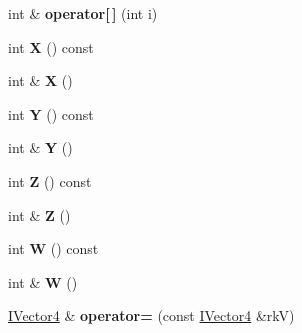 \begin{DoxyCompactItemize}
\item 
int \& {\bfseries operator\mbox{[}$\,$\mbox{]}} (int i)\hypertarget{class_i_dream_sky_1_1_i_vector4_ad8b14cfd1d022363abfdf7665750d552}{}\label{class_i_dream_sky_1_1_i_vector4_ad8b14cfd1d022363abfdf7665750d552}

\item 
int {\bfseries X} () const \hypertarget{class_i_dream_sky_1_1_i_vector4_a1c9c96bfa7fa142113f6362382d45ce4}{}\label{class_i_dream_sky_1_1_i_vector4_a1c9c96bfa7fa142113f6362382d45ce4}

\item 
int \& {\bfseries X} ()\hypertarget{class_i_dream_sky_1_1_i_vector4_ac0a1cd736bc371971488bec5e8f139ba}{}\label{class_i_dream_sky_1_1_i_vector4_ac0a1cd736bc371971488bec5e8f139ba}

\item 
int {\bfseries Y} () const \hypertarget{class_i_dream_sky_1_1_i_vector4_a7e9ff8894b63b11dab92ff2b222435a5}{}\label{class_i_dream_sky_1_1_i_vector4_a7e9ff8894b63b11dab92ff2b222435a5}

\item 
int \& {\bfseries Y} ()\hypertarget{class_i_dream_sky_1_1_i_vector4_a3a4d6d9006e744ab341617e880fbd517}{}\label{class_i_dream_sky_1_1_i_vector4_a3a4d6d9006e744ab341617e880fbd517}

\item 
int {\bfseries Z} () const \hypertarget{class_i_dream_sky_1_1_i_vector4_a8784a31667aa2b3e1e63e1004b70e703}{}\label{class_i_dream_sky_1_1_i_vector4_a8784a31667aa2b3e1e63e1004b70e703}

\item 
int \& {\bfseries Z} ()\hypertarget{class_i_dream_sky_1_1_i_vector4_aeb8a42e0fbef3fca7b5fcd97a149c91f}{}\label{class_i_dream_sky_1_1_i_vector4_aeb8a42e0fbef3fca7b5fcd97a149c91f}

\item 
int {\bfseries W} () const \hypertarget{class_i_dream_sky_1_1_i_vector4_aa8ad01dfacb216200bbcf585b236c5e2}{}\label{class_i_dream_sky_1_1_i_vector4_aa8ad01dfacb216200bbcf585b236c5e2}

\item 
int \& {\bfseries W} ()\hypertarget{class_i_dream_sky_1_1_i_vector4_aeefd4a4cb022b56277d8e8cdf32ea13d}{}\label{class_i_dream_sky_1_1_i_vector4_aeefd4a4cb022b56277d8e8cdf32ea13d}

\item 
\hyperlink{class_i_dream_sky_1_1_i_vector4}{I\+Vector4} \& {\bfseries operator=} (const \hyperlink{class_i_dream_sky_1_1_i_vector4}{I\+Vector4} \&rkV)\hypertarget{class_i_dream_sky_1_1_i_vector4_a2dc2406ba9332defdf932fc1e27bb95b}{}\label{class_i_dream_sky_1_1_i_vector4_a2dc2406ba9332defdf932fc1e27bb95b}


\end{DoxyCompactItemize}
